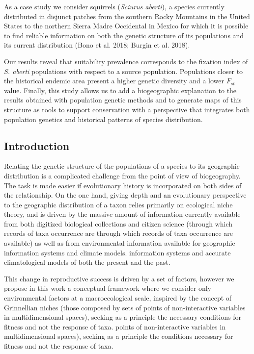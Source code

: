 \documentclass[
]{article}
\begin{document}
As a case study we consider squirrels (\emph{Sciurus aberti}), a species
currently distributed in disjunct patches from the southern Rocky
Mountains in the United States to the northern Sierra Madre Occidental
in Mexico for which it is possible to find reliable information on both
the genetic structure of its populations and its current distribution
(Bono et al. 2018; Burgin et al. 2018).

Our results reveal that suitability prevalence corresponds to the
fixation index of \emph{S. aberti} populations with respect to a source
population. Populations closer to the historical endemic area present a
higher genetic diversity and a lower \(F_{st}\) value. Finally, this
study allows us to add a biogeographic explanation to the results
obtained with population genetic methods and to generate maps of this
structure as tools to support conservation with a perspective that
integrates both population genetics and historical patterns of species
distribution.

\hypertarget{introduction}{%
\subsection{Introduction}\label{introduction}}

Relating the genetic structure of the populations of a species to its
geographic distribution is a complicated challenge from the point of
view of biogeography. The task is made easier if evolutionary history is
incorporated on both sides of the relationship. On the one hand, giving
depth and an evolutionary perspective to the geographic distribution of
a taxon relies primarily on ecological niche theory, and is driven by
the massive amount of information currently available from both
digitized biological collections and citizen science (through which
records of taxa occurrence are through which records of taxa occurrence
are available) as well as from environmental information available for
geographic information systems and climate models. information systems
and accurate climatological models of both the present and the past.

This change in reproductive success is driven by a set of factors,
however we propose in this work a conceptual framework where we consider
only environmental factors at a macroecological scale, inspired by the
concept of Grinnellian niches (those composed by sets of points of
non-interactive variables in multidimensional spaces), seeking as a
principle the necessary conditions for fitness and not the response of
taxa. points of non-interactive variables in multidimensional spaces),
seeking as a principle the conditions necessary for fitness and not the
response of taxa.
\end{document}
